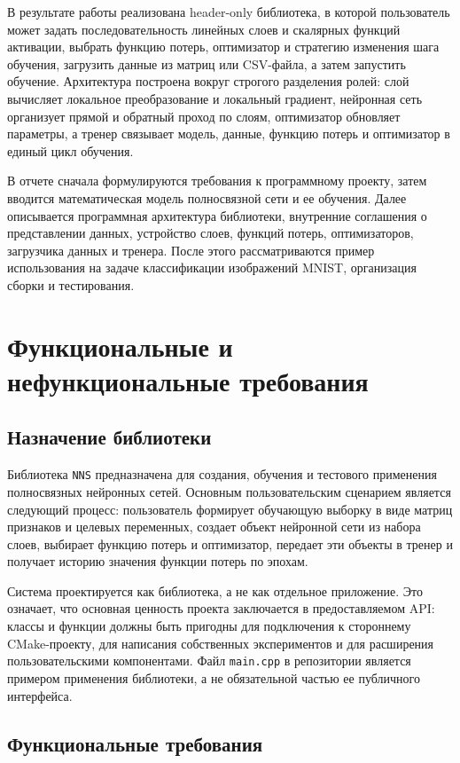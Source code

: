 \documentclass{article}
\begin{document}
В результате работы реализована header-only библиотека, в которой
пользователь может задать последовательность линейных слоев и
скалярных функций активации, выбрать функцию потерь, оптимизатор и
стратегию изменения шага обучения, загрузить данные из матриц или
CSV-файла, а затем запустить обучение.
Архитектура построена вокруг строгого разделения ролей: слой вычисляет
локальное преобразование и локальный градиент, нейронная сеть
организует прямой и обратный проход по слоям, оптимизатор обновляет
параметры, а тренер связывает модель, данные, функцию потерь и
оптимизатор в единый цикл обучения.

В отчете сначала формулируются требования к программному проекту,
затем вводится математическая модель полносвязной сети и ее обучения.
Далее описывается программная архитектура библиотеки, внутренние
соглашения о представлении данных, устройство слоев, функций потерь,
оптимизаторов, загрузчика данных и тренера. После этого
рассматриваются пример использования на задаче классификации
изображений MNIST, организация сборки и тестирования.

\section{Функциональные и нефункциональные требования}

\subsection{Назначение библиотеки}

Библиотека \texttt{NNS} предназначена для создания, обучения и
тестового применения полносвязных нейронных сетей. Основным
пользовательским сценарием является следующий процесс: пользователь
формирует обучающую выборку в виде матриц признаков и целевых
переменных, создает объект нейронной сети из набора слоев, выбирает
функцию потерь и оптимизатор, передает эти объекты в тренер и получает
историю значения функции потерь по эпохам.

Система проектируется как библиотека, а не как отдельное приложение.
Это означает, что основная ценность проекта заключается в
предоставляемом API: классы и функции должны быть пригодны для
подключения к стороннему CMake-проекту, для написания собственных
экспериментов и для расширения пользовательскими компонентами. Файл
\texttt{main.cpp} в репозитории является примером применения
библиотеки, а не обязательной частью ее публичного интерфейса.

\subsection{Функциональные требования}
\end{document}
